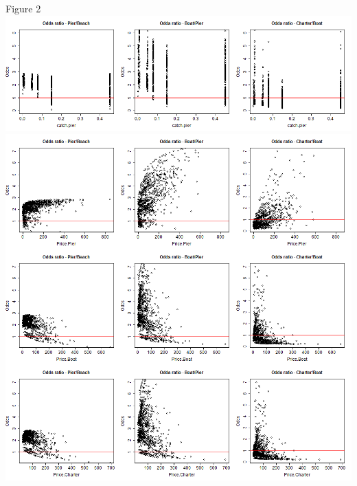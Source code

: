 \documentclass[12pt]{article}
\begin{document}
{Figure 2\\
\includegraphics[scale=0.47]{Ordered Odds 3}\\
\includegraphics[scale=0.47]{Ordered Odds 2}
}
\end{document}
